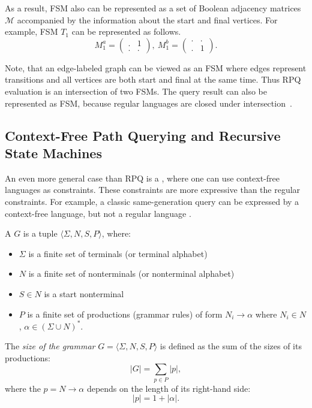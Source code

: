 As a result, FSM also can be represented as a set of Boolean adjacency matrices $\mathcal{M}$ accompanied by the information about the start and final vertices.
For example, FSM $T_1$ can be represented as follows.
$$
M_1^a =
\begin{pmatrix}
.&1 \\
.&.
\end{pmatrix},~
M_1^b =
\begin{pmatrix}
.&. \\
.&1
\end{pmatrix}.
$$

Note, that an edge-labeled graph can be viewed as an FSM where edges represent transitions and all vertices are both start and final at the same time.
Thus RPQ evaluation is an intersection of two FSMs.
The query result can also be represented as FSM, because regular languages are closed under intersection~\citep{automata:theory:10.5555/1177300}.

\subsection{Context-Free Path Querying and Recursive State Machines}

An even more general case than RPQ is a , where one can use context-free languages as constraints.
These constraints are more expressive than the regular constraints.
For example, a classic same-generation query can be expressed by a context-free language, but not a regular language \citep{databasebook}.

\begin{definition}
A  $G$ is a tuple $\langle\Sigma, N, S, P\rangle$, where:
\begin{itemize}
    \item $\Sigma$ is a finite set of terminals (or terminal alphabet)
    \item $N$ is a finite set of nonterminals (or nonterminal alphabet)
    \item $S \in N$ is a start nonterminal
    \item $P$ is a finite set of productions (grammar rules) of form $N_i \to \alpha$ where  $N_i \in N$, $\alpha \in (\Sigma \cup N)^*$.
\end{itemize}
\end{definition}

\begin{definition}

    The \emph{size of the grammar} $G = \langle \Sigma, N, S, P \rangle$ is defined as the sum of the sizes of its productions:
    \[|G| = \sum_{p \in P} |p|,\]
    where the  $p = N \to \alpha$ depends on the length of its right-hand side:
    \[|p| = 1 + |\alpha|.\]

\end{definition}

